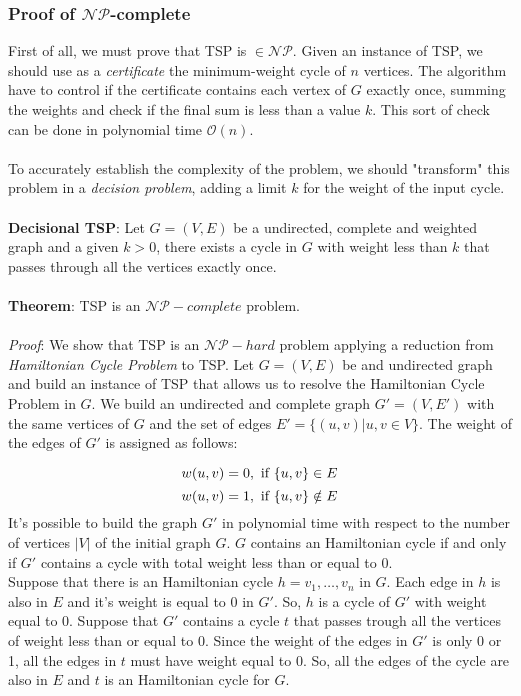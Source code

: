 \subsubsection{Proof of $\mathcal{NP}$-complete}
First of all, we must prove that TSP is $\in \mathcal{NP}$. Given an instance of TSP, we should use as a \textit{certificate} the minimum-weight cycle of $n$ vertices. The algorithm have to control if the certificate contains each vertex of $G$ exactly once, summing the weights and check if the final sum is less than a value $k$. This sort of check can be done in polynomial time $\mathcal{O}(n)$.\\
\\
\noindent
To accurately establish the complexity of the problem, we should "transform" this problem in a \textit{decision problem}, adding a limit $k$ for the weight of the input cycle.\\
\\
\noindent
\textbf{Decisional TSP}: Let $G = (V,E)$ be a undirected, complete and weighted graph and a given $k > 0$, there exists a cycle in $G$ with weight less than $k$ that passes through all the vertices exactly once.\\
\\
\noindent
\textbf{Theorem}: TSP is an $\mathcal{NP}-complete$ problem.\\
\\
\noindent
\textit{Proof}: We show that TSP is an $\mathcal{NP}-hard$ problem applying a reduction from \textit{Hamiltonian Cycle Problem} to TSP.
Let $G = (V,E)$ be and undirected graph and build an instance of TSP that allows us to resolve the Hamiltonian Cycle Problem in $G$. We build an undirected and complete graph $G' = (V, E')$ with the same vertices of $G$ and the set of edges $E' = \{(u, v) | u,v \in V\}$. The weight of the edges of $G'$ is assigned as follows:

\[
    w(u, v) = 0, \textnormal{ if } \{u, v\} \in E
\]
\[
    w(u, v) = 1, \textnormal{ if } \{u, v\} \notin E
\]
\noindent
It's possible to build the graph $G'$ in polynomial time with respect to the number of vertices $|V|$ of the initial graph $G$. $G$ contains an Hamiltonian cycle if and only if $G'$ contains a cycle with total weight less than or equal to 0. \\ \noindent 
Suppose that there is an Hamiltonian cycle $h = v_1, \dots, v_n$ in $G$. Each edge in $h$ is also in $E$ and it's weight is equal to 0 in $G'$. So, $h$ is a cycle of $G'$ with weight equal to 0. Suppose that $G'$ contains a cycle $t$ that passes trough all the vertices of weight less than or equal to 0. Since the weight of the edges in $G'$ is only 0 or 1, all the edges in $t$ must have weight equal to 0. So, all the edges of the cycle are also in $E$ and $t$ is an Hamiltonian cycle for $G$.

